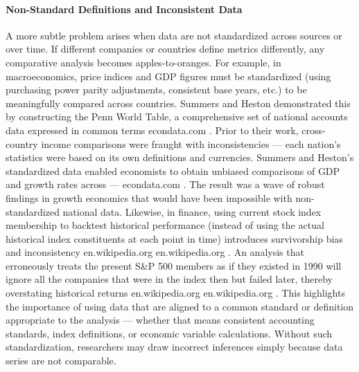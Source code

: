 \documentclass{article}
\begin{document}
\begin{appendices}
\paragraph{Non-Standard Definitions and Inconsistent Data}
A more subtle problem arises when data are not standardized across sources or over time. If different companies or countries define metrics differently, any comparative analysis becomes apples-to-oranges. For example, in macroeconomics, price indices and GDP figures must be standardized (using purchasing power parity adjustments, consistent base years, etc.) to be meaningfully compared across countries. Summers and Heston \cite{Summers1991} demonstrated this by constructing the Penn World Table, a comprehensive set of national accounts data expressed in common terms
econdata.com
. Prior to their work, cross-country income comparisons were fraught with inconsistencies --- each nation's statistics were based on its own definitions and currencies. Summers and Heston's standardized data enabled economists to obtain unbiased comparisons of GDP and growth rates across ---
econdata.com
. The result was a wave of robust findings in growth economics that would have been impossible with non-standardized national data. Likewise, in finance, using current stock index membership to backtest historical performance (instead of using the actual historical index constituents at each point in time) introduces survivorship bias and inconsistency
en.wikipedia.org
en.wikipedia.org
. An analysis that erroneously treats the present S\&P 500 members as if they existed in 1990 will ignore all the companies that were in the index then but failed later, thereby overstating historical returns
en.wikipedia.org
en.wikipedia.org
. This highlights the importance of using data that are aligned to a common standard or definition appropriate to the analysis --- whether that means consistent accounting standards, index definitions, or economic variable calculations. Without such standardization, researchers may draw incorrect inferences simply because data series are not comparable.


\end{appendices}
\end{document}
